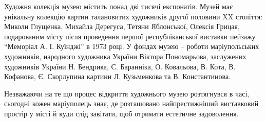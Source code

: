 
Художня колекція музею містить понад дві тисячі експонатів. Музей має
унікальну колекцію картин талановитих художників другої половини XX століття:
Миколи Глущенка, Михайла Дерегуса, Тетяни Яблонської, Олексія Грицая,
подарованим місту після проведення першої республіканської виставки пейзажу
\enquote{Меморіал А. І. Куїнджі} в 1973 році. У фондах музею – роботи маріупольських
художників, народного художника України Віктора Пономарьова, заслужених
художників України Н. Бендрика, С. Баранніка, О. Ковальова, В. Кота, В.
Кофанова, Є. Скорлупина картини Л. Кузьменкова та В. Константинова.

Незважаючи на те що процес відкриття художнього музею розтягнувся в часі,
сьогодні кожен маріуполець знає, де розташовано найпрестижніший виставковий
простір у місті й куди слід завітати, щоб отримати естетичне задоволення.

